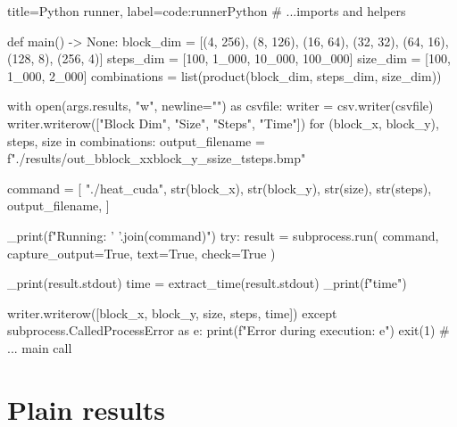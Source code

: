 \documentclass[../main.tex]{subfiles}
\begin{document}
\begin{code}{title=Python runner, label=code:runner}{Python}
# ...imports and helpers

def main() -> None:
    block_dim = [(4, 256), (8, 126), (16, 64), (32, 32), (64, 16), (128, 8), (256, 4)]
    steps_dim = [100, 1_000, 10_000, 100_000]
    size_dim = [100, 1_000, 2_000]
    combinations = list(product(block_dim, steps_dim, size_dim))

    with open(args.results, "w", newline="") as csvfile:
        writer = csv.writer(csvfile)
        writer.writerow(["Block Dim", "Size", "Steps", "Time"])
        for (block_x, block_y), steps, size in combinations:
            output_filename = f"./results/out_b{block_x}x{block_y}_s{size}_t{steps}.bmp"

            command = [
                "./heat_cuda",
                str(block_x),
                str(block_y),
                str(size),
                str(steps),
                output_filename,
            ]

            _print(f"Running: {' '.join(command)}")
            try:
                result = subprocess.run(
                    command, capture_output=True, text=True, check=True
                )

                _print(result.stdout)
                time = extract_time(result.stdout)
                _print(f"{time}\n")

                writer.writerow([block_x, block_y, size, steps, time])
            except subprocess.CalledProcessError as e:
                print(f"Error during execution: {e}")
                exit(1)
# ... main call
\end{code}

\section{Plain results}
\end{document}
